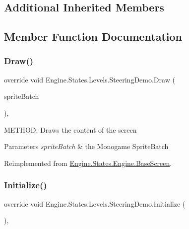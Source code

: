 \subsection*{Additional Inherited Members}


\subsection{Member Function Documentation}
\mbox{\label{a00570_a32c772a646fe78f26a4e9f83ae327156}} 
\subsubsection{\texorpdfstring{Draw()}{Draw()}}
{\footnotesize\ttfamily override void Engine.\+States.\+Levels.\+Steering\+Demo.\+Draw (\begin{DoxyParamCaption}\item[{Sprite\+Batch}]{sprite\+Batch }\end{DoxyParamCaption})\hspace{0.3cm}{\ttfamily [inline]}, {\ttfamily [virtual]}}



M\+E\+T\+H\+OD\+: Draws the content of the screen 


\begin{DoxyParams}{Parameters}
{\em sprite\+Batch} & the Monogame Sprite\+Batch\\
\hline
\end{DoxyParams}


Reimplemented from \hyperlink{a00550_a200c31954effe5fc060118607155fb16}{Engine.\+States.\+Engine.\+Base\+Screen}.

\mbox{\label{a00570_a3ae8b73b4618e8c2635d3b8c24d70bcb}} 
\subsubsection{\texorpdfstring{Initialize()}{Initialize()}}
{\footnotesize\ttfamily override void Engine.\+States.\+Levels.\+Steering\+Demo.\+Initialize (\begin{DoxyParamCaption}{ }\end{DoxyParamCaption})\hspace{0.3cm}{\ttfamily [inline]}, {\ttfamily [virtual]}}



